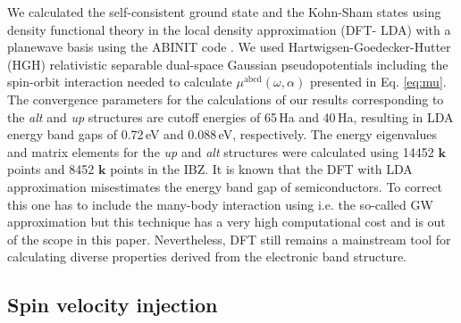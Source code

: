 \documentclass[prb,11pt,tightenlines,twocolumn,aps]{revtex4-1}
\begin{document}
We calculated the self-consistent ground state and the Kohn-Sham
states using density functional theory in the local density approximation (DFT-
LDA) with a planewave basis using the ABINIT code \cite{gonzeCPC09}.
% 
We used Hartwigsen-Goedecker-Hutter (HGH) relativistic separable dual-space
Gaussian pseudopotentials \cite{hartwigsenPRB98} including the spin-orbit
interaction needed to calculate $\mu^{\mathrm{abcd}}(\omega,\alpha)$ presented
in Eq. \eqref{eq:mu}.
% 
The convergence parameters for the calculations of our results corresponding to
the \emph{alt} and \emph{up} structures are cutoff energies of 65\,Ha and
40\,Ha, resulting in LDA energy band gaps of 0.72\,eV and 0.088\,eV,
respectively. The energy eigenvalues and matrix elements for the \emph{up} and
\emph{alt} structures were calculated using 14452 $\mathbf{k}$ points and 8452
$\mathbf{k}$ points in the IBZ.
% 
It is known that the DFT with LDA approximation misestimates the energy band
gap of semiconductors. To correct this one has to include the many-body
interaction using i.e. the so-called GW approximation but this technique has a
very high computational cost and is out of the scope in this paper.
Nevertheless, DFT still remains a mainstream tool for calculating diverse
properties derived from the electronic band structure.


\subsection{Spin velocity injection} %
\label{sec:res-spin_velocity}
\end{document}
